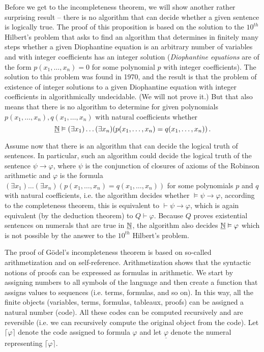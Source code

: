 Before we get to the incompleteness theorem, we will show another rather surprising result -- there is no algorithm that can decide whether a given sentence is logically true. The proof of this proposition is based on the solution to the $10^{th}$ Hilbert's problem that asks to find an algorithm that determines in finitely many steps whether a given Diophantine equation is an arbitrary number of variables and with integer coefficients has an integer solution (\emph{Diophantine equations} are of the form $p(x_1, \dots, x_n) = 0$ for some polynomial $p$ with integer coefficients). The solution to this problem was found in 1970, and the result is that the problem of existence of integer solutions to a given Diophantine equation with integer coefficients in algorithmically undecidable. (We will not prove it.) But that also means that there is no algorithm to determine for given polynomials $p(x_1, \dots, x_n), q(x_1, \dots, x_n)$ with natural coefficients whether $$\underline{\mathbb{N}} \vDash (\exists x_1)\dots(\exists x_n)(p(x_1, \dots, x_n) = q(x_1, \dots, x_n))\,.$$

Assume now that there is an algorithm that can decide the logical truth of sentences. In particular, such an algorithm could decide the logical truth of the sentence $\psi \to \varphi$, where $\psi$ is the conjunction of closures of axioms of the Robinson arithmetic and $\varphi$ is the formula $(\exists x_1)\dots(\exists x_n)(p(x_1, \dots, x_n) = q(x_1, \dots, x_n))$ for some polynomials $p$ and $q$ with natural coefficients, i.e. the algorithm decides whether $\vDash \psi \to \varphi$, according to the completeness theorem, this is equivalent to $\vdash \psi \to \varphi$, which is again equivalent (by the deduction theorem) to $Q \vdash \varphi$. Because $Q$ proves existential sentences on numerals that are true in $\underline{\mathbb{N}}$, the algorithm also decides $\underline{\mathbb{N}} \vDash \varphi$ which is not possible by the answer to the $10^{th}$ Hilbert's problem.

The proof of Gödel's incompleteness theorem is based on so-called arithmetization and on self-reference. Arithmetization shows that the syntactic notions of proofs can be expressed as formulas in arithmetic. We start by assigning numbers to all symbols of the language and then create a function that assigns values to sequences (i.e. terms, formulas, and so on). In this way, all the finite objects (variables, terms, formulas, tableaux, proofs) can be assigned a natural number (code). All these codes can be computed recursively and are reversible (i.e. we can recursively compute the original object from the code). Let $\lceil \varphi \rceil$ denote the code assigned to formula $\varphi$ and let $\underline{\varphi}$ denote the numeral representing $\lceil \varphi \rceil$.

